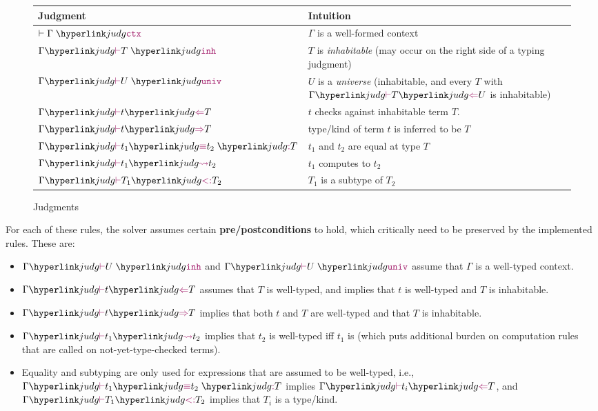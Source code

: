 \begin{figure}[ht]\centering%
\begin{tabular}{|l|l|} 
\hline
 Judgment & Intuition \\ \hline
 \hline $\wfctx \Gamma$ & $\Gamma$ is a well-formed context \\
 \hline $\gjudg{\judginh T}$ & $T$ is \emph{inhabitable} (may occur on the right side of a typing judgment) \\
 \hline $\gjudg{\judguniv U}$ & $U$ is a \emph{universe} (inhabitable, and every $T$ with $\gjudg{\hastype T U}$ is inhabitable)\\
 \hline\hline $\gjudg{ \hastype t T}$ & $t$ checks against inhabitable term $T$. \\
 \hline $\gjudg{ \infertype t T}$ & type/kind of term $t$ is inferred to be $T$ \\
 \hline $\gjudg{ \judgeq {t_1} {t_2} T}$ & $t_1$ and $t_2$ are equal at type $T$ \\
 \hline $\gjudg{ \judgeqc {t_1} {t_2}}$ & $t_1$ computes to $t_2$ \\
 \hline $\gjudg{ \subtp {T_1}{T_2} }$ & $T_1$ is a subtype of $T_2$ \\
\hline
\end{tabular}
\caption{Judgments}\label{fig:intro:prelim:judgments}
\end{figure}

For each of these rules, the solver assumes certain \textbf{pre/postconditions} to hold, which critically need to be preserved by the implemented rules. These are:
\begin{itemize}
	\item $\gjudg{\judginh U}$ and $\gjudg{\judguniv U}$ assume that $\Gamma$ is a well-typed context.
	\item $\gjudg{ \hastype t T}$ assumes that $T$ is well-typed, and implies that $t$ is well-typed and $T$ is inhabitable.
	\item $\gjudg{ \infertype t T}$ implies that both $t$ and $T$ are well-typed and that $T$ is inhabitable.
	\item $\gjudg{ \judgeqc{t_1}{t_2}}$ implies that $t_2$ is well-typed iff $t_1$ is (which puts additional burden on computation rules that are called on not-yet-type-checked terms).
	\item Equality and subtyping are only used for expressions that are assumed to be well-typed, i.e.,
$\gjudg{ \judgeq {t_1} {t_2} T}$ implies $\gjudg{ \hastype{t_i} T}$, and $\gjudg{ \subtp {T_1}{T_2} }$ implies that $T_i$ is a type/kind.
\end{itemize}

